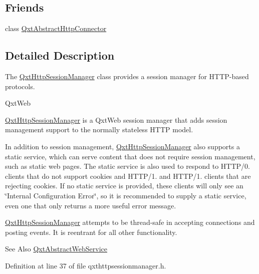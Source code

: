 \subsection*{Friends}
\begin{DoxyCompactItemize}
\item 
class \hyperlink{class_qxt_http_session_manager_a09c9a20cde2bc4b51280cff5807a1bc8}{Qxt\-Abstract\-Http\-Connector}
\end{DoxyCompactItemize}


\subsection{Detailed Description}
The \hyperlink{class_qxt_http_session_manager}{Qxt\-Http\-Session\-Manager} class provides a session manager for H\-T\-T\-P-\/based protocols. 

Qxt\-Web

\hyperlink{class_qxt_http_session_manager}{Qxt\-Http\-Session\-Manager} is a Qxt\-Web session manager that adds session management support to the normally stateless H\-T\-T\-P model.

In addition to session management, \hyperlink{class_qxt_http_session_manager}{Qxt\-Http\-Session\-Manager} also supports a static service, which can serve content that does not require session management, such as static web pages. The static service is also used to respond to H\-T\-T\-P/0. clients that do not support cookies and H\-T\-T\-P/1. and H\-T\-T\-P/1. clients that are rejecting cookies. If no static service is provided, these clients will only see an \char`\"{}\-Internal Configuration Error\char`\"{}, so it is recommended to supply a static service, even one that only returns a more useful error message.

\hyperlink{class_qxt_http_session_manager}{Qxt\-Http\-Session\-Manager} attempts to be thread-\/safe in accepting connections and posting events. It is reentrant for all other functionality.

\begin{DoxySeeAlso}{See Also}
\hyperlink{class_qxt_abstract_web_service}{Qxt\-Abstract\-Web\-Service} 
\end{DoxySeeAlso}


Definition at line 37 of file qxthttpsessionmanager.\-h.



